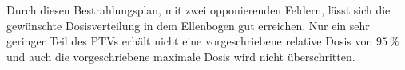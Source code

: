 Durch diesen Bestrahlungsplan, mit zwei opponierenden Feldern, lässt sich die gewünschte
Dosisverteilung in dem Ellenbogen gut erreichen. Nur ein sehr geringer Teil des
PTVs erhält nicht eine vorgeschriebene relative Dosis von $\SI{95}{\percent}$ und auch die
vorgeschriebene maximale Dosis wird nicht überschritten.
